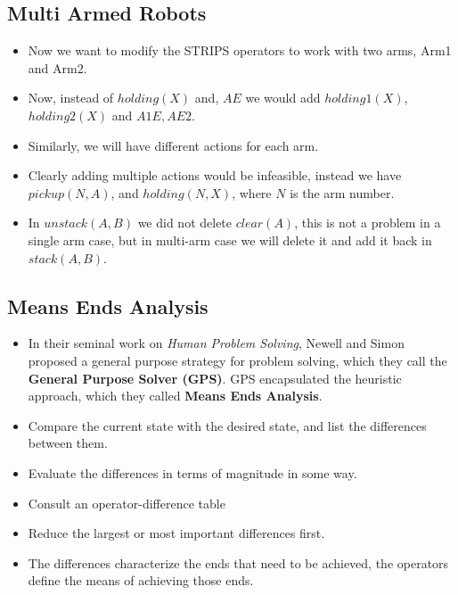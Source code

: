 \documentclass[a4paper]{article}
\begin{document}
\subsection{Multi Armed Robots}
\begin{itemize}
    \item Now we want to modify the STRIPS operators to work with two arms, Arm1 and Arm2.
    \item Now, instead of $holding(X)$ and, $AE$ we would add $holding1(X)$, $holding2(X)$ and $A1E,AE2$.
    \item Similarly, we will have different actions for each arm.
    \item Clearly adding multiple actions would be infeasible, instead we have $pickup(N,A)$, and $holding(N,X)$, where $N$ is the arm number.
    \item In $unstack(A,B)$ we did not delete $clear(A)$, this is not a problem in a single arm case, but in multi-arm case we will delete it and add it back in $stack(A,B)$.
\end{itemize}

\subsection{Means Ends Analysis}
\begin{itemize}
    \item In their seminal work on \textit{Human Problem Solving}, Newell and Simon proposed a general purpose strategy for problem solving, which they call the \textbf{General Purpose Solver (GPS)}. GPS encapsulated the heuristic approach, which they called \textbf{Means Ends Analysis}.
    \item Compare the current state with the desired state, and list the differences between them.
    \item Evaluate the differences in terms of magnitude in some way.
    \item Consult an operator-difference table
    \item Reduce the largest or most important differences first.
    \item The differences characterize the ends that need to be achieved, the operators define the means of achieving those ends.
\end{itemize}
\end{document}

